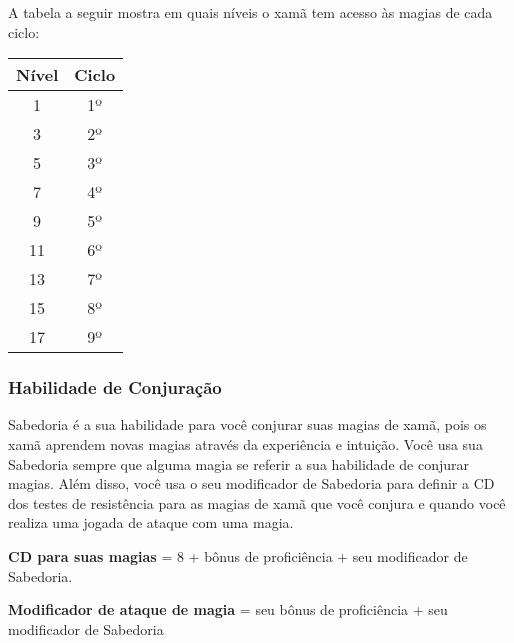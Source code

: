 \begin{multicols}{2}
A tabela a seguir mostra em quais níveis o xamã tem acesso às magias de cada
ciclo:

\begin{center}
\begin{tabular}{|||c||c|||}
    \hline
    \textbf{Nível} & \textbf{Ciclo} \\
    \hline
    1 & 1º \\
    \hline
    3 & 2º \\
    \hline
    5 & 3º \\
    \hline
    7 & 4º \\
    \hline
    9 & 5º \\
    \hline
    11 & 6º \\
    \hline
    13 & 7º \\
    \hline
    15 & 8º \\
    \hline
    17 & 9º \\
    \hline
\end{tabular}
\end{center}

\subsubsection*{Habilidade de Conjuração}%

Sabedoria é a sua habilidade para você conjurar suas magias de xamã, pois os
xamã aprendem novas magias através da experiência e intuição. Você usa sua
Sabedoria sempre que alguma magia se referir a sua habilidade de conjurar
magias. Além disso, você usa o seu modificador de Sabedoria para definir a CD
dos testes de resistência para as magias de xamã que você conjura e quando você
realiza uma jogada de ataque com uma magia.

\begin{center}
\textbf{CD para suas magias} = 8 + bônus de proficiência + seu modificador de
Sabedoria. \nl

\textbf{Modificador de ataque de magia} = seu bônus de proficiência + seu
modificador de Sabedoria
\end{center}

\end{multicols}
